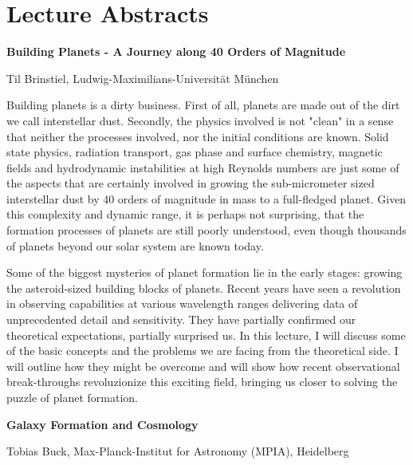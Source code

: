 
\section*{Lecture Abstracts}

\begin{center}
{{\large\bfseries Building Planets - A Journey along 40 Orders of Magnitude}\par} \medskip

{\large Til Brinstiel, Ludwig-Maximilians-Universität München\par}
\end{center}

\noindent Building planets is a dirty business. First of all, planets are made out of the dirt we call interstellar dust. Secondly, the physics involved is not "clean" in a sense that neither the processes involved, nor the initial conditions are known. Solid state physics, radiation transport, gas phase and surface chemistry, magnetic fields and hydrodynamic instabilities at high Reynolds numbers are just some of the aspects that are certainly involved in growing the sub-micrometer sized interstellar dust by 40 orders of magnitude in mass to a full-fledged planet. Given this complexity and dynamic range, it is perhaps not surprising, that the formation processes of planets are still poorly understood, even though thousands of planets beyond our solar system are known today.

Some of the biggest mysteries of planet formation lie in the early stages: growing the asteroid-sized building blocks of planets. Recent years have seen a revolution in observing capabilities at various wavelength ranges delivering data of unprecedented detail and sensitivity. They have partially confirmed our theoretical expectations, partially surprised us. In this lecture, I will discuss some of the basic concepts and the problems we are facing from the theoretical side. I will outline how they might be overcome and will show how recent observational break-throughs revoluzionize this exciting field, bringing us closer to solving the puzzle of planet formation.\par
\newpage


\begin{center}
{{\large\bfseries Galaxy Formation and Cosmology}\par} \medskip

{\large Tobias Buck, Max-Planck-Institut for Astronomy (MPIA), Heidelberg\par}
\end{center}

